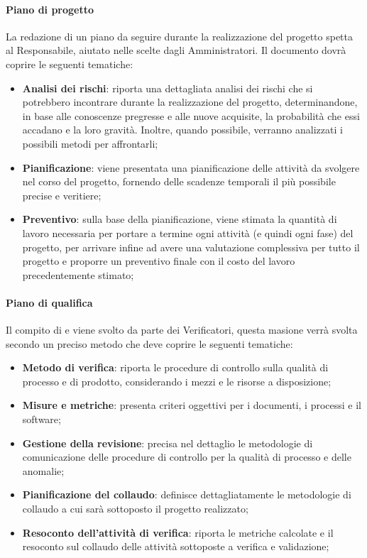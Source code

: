 \paragraph{Piano di progetto}\Spazio
La redazione di un piano da seguire durante la realizzazione del progetto spetta al Responsabile, aiutato nelle scelte dagli Amministratori. Il documento dovrà coprire le seguenti tematiche:
 \begin{itemize}
 	\item\textbf{{Analisi dei rischi}}: riporta una dettagliata analisi dei rischi che si potrebbero incontrare durante la realizzazione del progetto, determinandone, in base alle conoscenze pregresse e alle nuove acquisite, la probabilità che essi accadano e la loro gravità. Inoltre, quando possibile, verranno analizzati i possibili metodi per affrontarli;
 	\item\textbf{{Pianificazione}}: viene presentata una pianificazione delle attività da svolgere nel corso del progetto, fornendo delle scadenze temporali il più possibile precise e veritiere;
 	\item\textbf{{Preventivo}}: sulla base della pianificazione, viene stimata la quantità di lavoro necessaria per portare a termine ogni attività (e quindi ogni fase) del progetto, per arrivare infine ad avere una valutazione complessiva per tutto il progetto e proporre un preventivo finale con il costo del lavoro precedentemente stimato; 		
 \end{itemize}
\paragraph{Piano di qualifica}\Spazio
Il compito di  e  viene svolto da parte dei Verificatori, questa masione verrà svolta secondo un preciso metodo che deve coprire le seguenti tematiche:
\begin{itemize}
	\item\textbf{{Metodo di verifica}}: riporta le procedure di controllo sulla qualità di processo e di prodotto, considerando i mezzi e le risorse a disposizione; 	
	\item\textbf{{Misure e metriche}}: presenta criteri oggettivi per i documenti, i processi e il software; 	
	\item\textbf{{Gestione della revisione}}: precisa nel dettaglio le metodologie di comunicazione delle procedure di controllo per la qualità di processo e delle anomalie; 	
	\item\textbf{{Pianificazione del collaudo}}: definisce dettagliatamente le metodologie di collaudo a cui sarà sottoposto il progetto realizzato; 	
	\item\textbf{{Resoconto dell'attività di verifica}}: riporta le metriche calcolate e il resoconto sul collaudo delle attività sottoposte a verifica e validazione; 			
\end{itemize}
